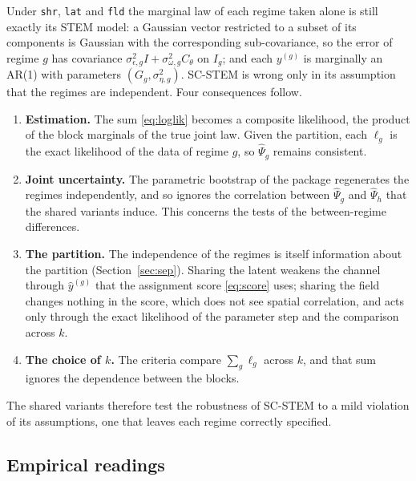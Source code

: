 \documentclass[11pt]{article}
\begin{document}
Under \texttt{shr}, \texttt{lat} and \texttt{fld} the marginal law of each regime taken alone is still exactly its STEM model: a Gaussian vector restricted to a subset of its components is Gaussian with the corresponding sub-covariance, so the error of regime $g$ has covariance $\sigma^2_{\epsilon,g} I + \sigma^2_{\omega,g} C_\theta$ on $I_g$; and each $y^{(g)}$ is marginally an AR(1) with parameters $(G_g, \sigma^2_{\eta,g})$. SC-STEM is wrong only in its assumption that the regimes are independent. Four consequences follow.
\begin{enumerate}[leftmargin=2em]
  \item \textbf{Estimation.} The sum \eqref{eq:loglik} becomes a composite likelihood, the product of the block marginals of the true joint law. Given the partition, each $\ell_g$ is the exact likelihood of the data of regime $g$, so $\hat\Psi_g$ remains consistent.
  \item \textbf{Joint uncertainty.} The parametric bootstrap of the package regenerates the regimes independently, and so ignores the correlation between $\hat\Psi_g$ and $\hat\Psi_h$ that the shared variants induce. This concerns the tests of the between-regime differences.
  \item \textbf{The partition.} The independence of the regimes is itself information about the partition (Section~\ref{sec:sep}). Sharing the latent weakens the channel through $\hat y^{(g)}$ that the assignment score \eqref{eq:score} uses; sharing the field changes nothing in the score, which does not see spatial correlation, and acts only through the exact likelihood of the parameter step and the comparison across $k$.
  \item \textbf{The choice of $k$.} The criteria compare $\sum_g \ell_g$ across $k$, and that sum ignores the dependence between the blocks.
\end{enumerate}
The shared variants therefore test the robustness of SC-STEM to a mild violation of its assumptions, one that leaves each regime correctly specified.

\subsection{Empirical readings}
\end{document}
